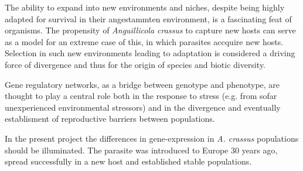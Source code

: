 


\begin{abstracts}        %

The ability to expand into new environments and niches, despite being
highly adapted for survival in their angestammten environment, is a
fascinating feat of organisms. The propensity of \textit{Anguillicola
  crassus} to capture new hosts can serve as a model for an extreme
case of this, in which parasites accquire new hosts. Selection in such
new environments leading to adaptation is considered a driving force
of divergence and thus for the origin of species and biotic diversity.

Gene regulatory networks, as a bridge between genotype and phenotype,
are thought to play a central role both in the response to stress
(e.g. from sofar unexperienced environmental stressors) and in the
divergence and eventually establisment of reproductive barriers
between populations.

In the present project the differences in gene-expression in
\textit{A. crassus} populations should be illuminated. The parasite
was introduced to Europe 30 years ago, spread successfully in a new
host and established stable populations. 

\end{abstracts}



     